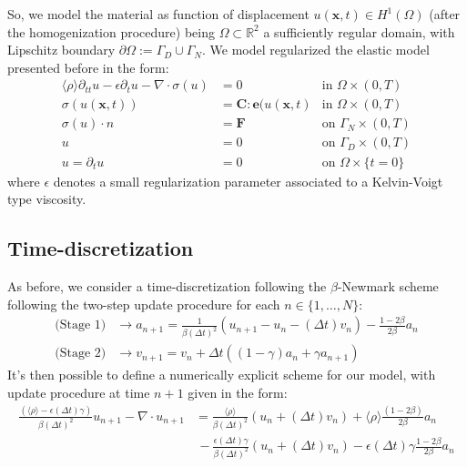 So, we model the material as function of displacement $u(\mathbf{x},t) \in H^{1}(\Omega)$ (after the homogenization procedure) being $\Omega \subset \mathbb{R}^2$ a sufficiently regular domain, with Lipschitz boundary $\partial \Omega := \Gamma_D \cup \Gamma_N$. 
We model regularized the elastic model presented before in the form:
\begin{align*}
    \langle \rho \rangle \partial_{tt} u - \epsilon \partial_{t} u - \nabla \cdot \sigma(u) & = 0 & \text{in } \Omega \times (0,T) \\
    \sigma(u(\mathbf{x},t)) & =  \mathbf{C}:\mathbf{e}(u(\mathbf{x},t)  & \text{in }\Omega \times (0,T)\\
    \sigma(u)\cdot n & = \mathbf{F} & \text{on }\Gamma_N\times (0,T) \\
    u & = 0 & \text{on }\Gamma_D \times (0,T) \\
    u = \partial_t u & = 0& \text{on } \Omega \times \{t=0\}
\end{align*}
where $\epsilon$ denotes a small regularization parameter associated to a Kelvin-Voigt type viscosity. 
\subsection{Time-discretization}
As before, we consider a time-discretization following the $\beta$-Newmark scheme following the two-step update procedure for each $n \in \{1,\dots, N\}$:
\begin{align*}
    \text{(Stage 1)} &\longrightarrow a_{n+1} = \frac{1}{\beta (\Delta t)^2} (u_{n+1}-u_{n}-(\Delta t)v_n) - \frac{1-2\beta}{2\beta}a_n\\
    \text{(Stage 2)}& \longrightarrow v_{n+1} = v_n + \Delta t((1-\gamma)a_n + \gamma a_{n+1})
\end{align*}
It's then possible to define a numerically explicit scheme for our model, with update procedure at time $n+1$ given in the form:
\begin{align*}
    \frac{(\langle \rho \rangle- \epsilon (\Delta t) \gamma)}{\beta (\Delta t)^2} u_{n+1} - \nabla \cdot u_{n+1} &= \frac{\langle \rho \rangle}{\beta (\Delta t)^2} (u_n + (\Delta t)v_n) + \langle \rho \rangle\frac{ (1-2\beta)}{2\beta}a_n \\
    & \, - \frac{\epsilon (\Delta t)\gamma}{\beta (\Delta t)^2}(u_n + (\Delta t)v_n) - \epsilon (\Delta t)\gamma\frac{1-2\beta}{2 \beta} a_n
\end{align*}

